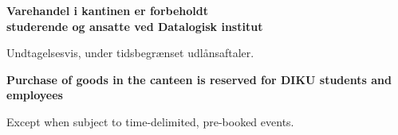 \documentclass{article}
\begin{document}
\maketitle

\null

\vspace{-0.5cm}

\begin{center}

\vspace{0.5cm}%
\begin{center}%

\fontsize{30}{30}\selectfont\bf Varehandel i kantinen er forbeholdt \\
studerende og ansatte ved Datalogisk institut

\end{center}%
\vspace{0.7cm}%

\vspace{-0.7cm}

\Huge

Undtagelsesvis, under tidsbegrænset udlånsaftaler.

\english

\vspace{0.7cm}%
\begin{center}%

\fontsize{30}{30}\selectfont\bf Purchase of goods in the canteen is reserved
for DIKU students and employees

\end{center}%
\vspace{0.7cm}%

\vspace{-1.1cm}

Except when subject to time-delimited, pre-booked events.

\end{center}

\dansk

\underskriv
\end{document}
